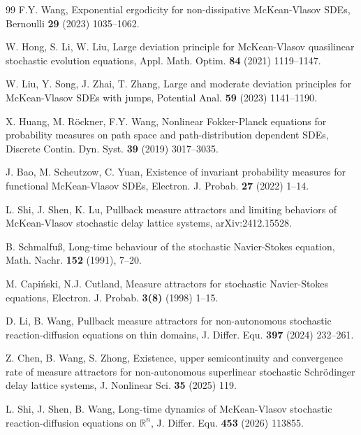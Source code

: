 \documentclass[11pt]{article}
\numberwithin{equation}{section}
\theoremstyle{plain}
\begin{document}
\begin{thebibliography}{99}
	F.Y. Wang,
	Exponential ergodicity for non-dissipative McKean-Vlasov SDEs,
	Bernoulli \textbf{29} (2023) 1035--1062.	
    
	
	W. Hong, S. Li, W. Liu,
	Large deviation principle for McKean-Vlasov quasilinear stochastic evolution equations,
	Appl. Math. Optim. \textbf{84} (2021) 1119--1147.
	
	W. Liu, Y. Song, J. Zhai, T. Zhang,
	Large and moderate deviation principles for McKean-Vlasov SDEs with jumps,
	Potential Anal. \textbf{59} (2023) 1141--1190.
			
	X. Huang, M. R{\"o}ckner, F.Y. Wang,
	Nonlinear Fokker-Planck equations for probability measures on path space and path-distribution dependent SDEs,
	Discrete Contin. Dyn. Syst. \textbf{39} (2019) 3017--3035.
	
    J. Bao, M. Scheutzow, C. Yuan, 
    Existence of invariant probability measures for functional McKean-Vlasov SDEs,
    Electron. J. Probab.  \textbf{27} (2022) 1--14.			
    
	L. Shi, J. Shen, K. Lu, 
	Pullback measure attractors and limiting behaviors of McKean-Vlasov stochastic delay lattice systems, 
	arXiv:2412.15528.
	
	
	B. Schmalfu{\ss},
	Long-time behaviour of the stochastic Navier-Stokes equation,
	Math. Nachr. \textbf{152} (1991), 7--20.
	
	M. Capi{\'n}ski, N.J. Cutland,
	Measure attractors for stochastic Navier-Stokes equations,
	Electron. J. Probab. \textbf{3(8)} (1998) 1--15.
		
	D. Li, B. Wang,
	Pullback measure attractors for non-autonomous stochastic reaction-diffusion equations on thin domains,
	J. Differ. Equ. \textbf{397} (2024) 232--261.
	
	Z. Chen, B. Wang, S. Zhong,
	Existence, upper semicontinuity and convergence rate of measure attractors for non-autonomous superlinear stochastic Schr{\"o}dinger delay lattice systems,
	J. Nonlinear Sci. \textbf{35} (2025) 119.

		

	L. Shi, J. Shen, B. Wang,
	Long-time dynamics of McKean-Vlasov stochastic reaction-diffusion equations on $\mathbb{R}^n$,
	J. Differ. Equ. \textbf{453} (2026) 113855.
	

\end{thebibliography}
\end{document}
